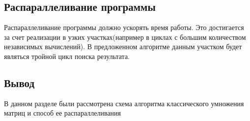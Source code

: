 \documentclass[a4paper, 12pt]{article}
\begin{document}
\begin{flushleft}
	\subsection{Распараллеливание программы}
	\hspace*{5mm} Распараллеливание программы должно ускорять время работы. Это достигается за счет реализации в узких участках(например в циклах с большим количеством независимых вычислений). В предложенном алгоритме данным участком будет являться тройной цикл поиска результата.
	
	\subsection{Вывод}
	\hspace*{5mm} В данном разделе были рассмотрена схема алгоритма классического умножения матриц и способ ее распараллеливания
\end{flushleft}

\newpage
\end{document}
